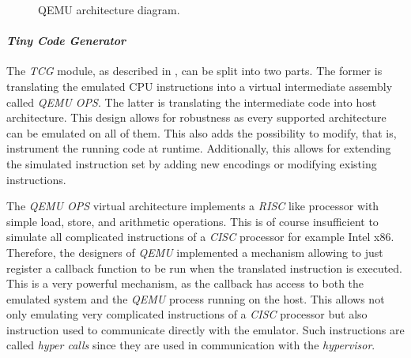 \begin{figure}[h!]
    \centering

    
    \caption{QEMU architecture diagram.}
    \label{fig:qemuarch}
\end{figure}


\pagebreak
\paragraph{\textit{Tiny Code Generator}}
The \textit{TCG} module, as described in \cite{qemutcg}, can be split into two parts. The former is translating the emulated CPU instructions into a virtual intermediate assembly called \textit{QEMU OPS}. The latter is translating the intermediate code into host architecture. This design allows for robustness as every supported architecture can be emulated on all of them. This also adds the possibility to modify, that is, instrument the running code at runtime. Additionally, this allows for extending the simulated instruction set by adding new encodings or modifying existing instructions.

The \textit{QEMU OPS} virtual architecture implements a \textit{RISC} like processor with simple load, store, and arithmetic operations. This is of course insufficient to simulate all complicated instructions of a \textit{CISC} processor for example Intel x86. Therefore, the designers of \textit{QEMU} implemented a mechanism allowing to just register a callback function to be run when the translated instruction is executed. This is a very powerful mechanism, as the callback has access to both the emulated system and the \textit{QEMU} process running on the host. This allows not only emulating very complicated instructions of a \textit{CISC} processor but also instruction used to communicate directly with the emulator. Such instructions are called \textit{hyper calls} since they are used in communication with the \textit{hypervisor}.

